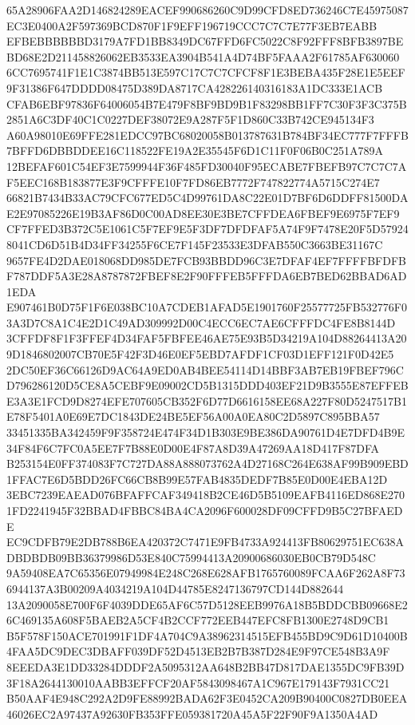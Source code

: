 \documentclass[UTF8,fontset=fandol,zihao=-4,a4paper]{ctexart}
\begin{document}
{{65A28906FAA2D146824289EACEF990686260C9D99CFD8ED736246C7E45975087EC3E0400A2F597369BCD870F1F9EFF196719CCC7C7C7E77F3EB7EABB
EFBEBBBBBBD3179A7FD1BB8349DC67FFD6FC5022C8F92FFF8BFB3897BEBD68E2D211458826062EB3533EA3904B541A4D74BF5FAAA2F61785AF630060
6CC7695741F1E1C3874BB513E597C17C7C7CFCF8F1E3BEBA435F28E1E5EEF9F31386F647DDDD08475D389DA8717CA428226140316183A1DC333E1ACB
CFAB6EBF97836F64006054B7E479F8BF9BD9B1F83298BB1FF7C30F3F3C375B2851A6C3DF40C1C0227DEF38072E9A287F5F1D860C33B742CE945134F3
A60A98010E69FFE281EDCC97BC68020058B013787631B784BF34EC777F7FFFB7BFFD6DBBDDEE16C118522FE19A2E35545F6D1C11F0F06B0C251A789A
12BEFAF601C54EF3E7599944F36F485FD30040F95ECABE7FBEFB97C7C7C7AF5EEC168B183877E3F9CFFFE10F7FD86EB7772F747822774A5715C274E7
66821B7434B33AC79CFC677ED5C4D99761DA8C22E01D7BF6D6DDFF81500DAE2E97085226E19B3AF86D0C00AD8EE30E3BE7CFFDEA6FBEF9E6975F7EF9
CF7FFED3B372C5E1061C5F7EF9E5F3DF7DFDFAF5A74F9F7478E20F5D579248041CD6D51B4D34FF34255F6CE7F145F23533E3DFAB550C3663BE31167C
9657FE4D2DAE018068DD985DE7FCB93BBDD96C3E7DFAF4EF7FFFFBFDFBF787DDF5A3E28A8787872FBEF8E2F90FFFEB5FFFDA6EB7BED62BBAD6AD1EDA
E907461B0D75F1F6E038BC10A7CDEB1AFAD5E1901760F25577725FB532776F03A3D7C8A1C4E2D1C49AD309992D00C4ECC6EC7AE6CFFFDC4FE8B8144D
3CFFDF8F1F3FFEF4D34FAF5FBFEE46AE75E93B5D34219A104D88264413A209D1846802007CB70E5F42F3D46E0EF5EBD7AFDF1CF03D1EFF121F0D42E5
2DC50EF36C66126D9AC64A9ED0AB4BEE54114D14BBF3AB7EB19FBEF796CD796286120D5CE8A5CEBF9E09002CD5B1315DDD403EF21D9B3555E87EFFEB
E3A3E1FCD9D8274EFE707605CB352F6D77D6616158EE68A227F80D5247517B1E78F5401A0E69E7DC1843DE24BE5EF56A00A0EA80C2D5897C895BBA57
33451335BA342459F9F358724E474F34D1B303E9BE386DA90761D4E7DFD4B9E34F84F6C7FC0A5EE7F7B88E0D00E4F87A8D39A47269AA18D417F87DFA
B253154E0FF374083F7C727DA88A888073762A4D27168C264E638AF99B909EBD1FFAC7E6D5BDD26FC66CB8B99E57FAB4835DEDF7B85E0D00E4EBA12D
3EBC7239EAEAD076BFAFFCAF349418B2CE46D5B5109EAFB4116ED868E2701FD2241945F32BBAD4FBBC84BA4CA2096F600028DF09CFFD9B5C27BFAEDE
EC9CDFB79E2DB788B6EA420372C7471E9FB4733A924413FB80629751EC638ADBDBDB09BB36379986D53E840C75994413A20900686030EB0CB79D548C
9A59408EA7C65356E07949984E248C268E628AFB1765760089FCAA6F262A8F736944137A3B00209A4034219A104D44785E8247136797CD144D882644
13A2090058E700F6F4039DDE65AF6C57D5128EEB9976A18B5BDDCBB09668E26C469135A608F5BAEB2A5CF4B2CCF772EEB447EFC8FB1300E2748D9CB1
B5F578F150ACE701991F1DF4A704C9A38962314515EFB455BD9C9D61D10400B4FAA5DC9DEC3DBAFF039DF52D4513EB2B7B387D284E9F97CE548B3A9F
8EEEDA3E1DD33284DDDF2A5095312AA648B2BB47D817DAE1355DC9FB39D3F18A2644130010AABB3EFFCF20AF5843098467A1C967E179143F7931CC21
B50AAF4E948C292A2D9FE88992BADA62F3E0452CA209B90400C0827DB0EEA46026EC2A97437A92630FB353FFE059381720A45A5F22F90F9A1350A4AD
}}
\end{document}

